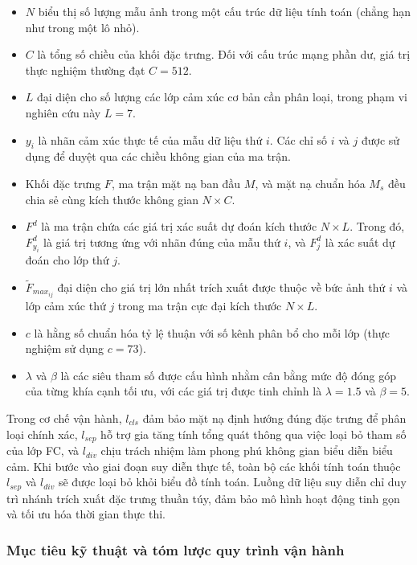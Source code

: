 \begin{itemize}
    \item $N$ biểu thị số lượng mẫu ảnh trong một cấu trúc dữ liệu tính toán (chẳng hạn như trong một lô nhỏ).
    \item $C$ là tổng số chiều của khối đặc trưng. Đối với cấu trúc mạng phần dư, giá trị thực nghiệm thường đạt $C = 512$.
    \item $L$ đại diện cho số lượng các lớp cảm xúc cơ bản cần phân loại, trong phạm vi nghiên cứu này $L = 7$.
    \item $y_i$ là nhãn cảm xúc thực tế của mẫu dữ liệu thứ $i$. Các chỉ số $i$ và $j$ được sử dụng để duyệt qua các chiều không gian của ma trận.
    \item Khối đặc trưng $F$, ma trận mặt nạ ban đầu $M$, và mặt nạ chuẩn hóa $M_s$ đều chia sẻ cùng kích thước không gian $N \times C$.
    \item $F^d$ là ma trận chứa các giá trị xác suất dự đoán kích thước $N \times L$. Trong đó, $F^d_{y_i}$ là giá trị tương ứng với nhãn đúng của mẫu thứ $i$, và $F^d_j$ là xác suất dự đoán cho lớp thứ $j$.
    \item $\tilde{F}_{max_{ij}}$ đại diện cho giá trị lớn nhất trích xuất được thuộc về bức ảnh thứ $i$ và lớp cảm xúc thứ $j$ trong ma trận cực đại kích thước $N \times L$.
    \item $c$ là hằng số chuẩn hóa tỷ lệ thuận với số kênh phân bổ cho mỗi lớp (thực nghiệm sử dụng $c = 73$).
    \item $\lambda$ và $\beta$ là các siêu tham số được cấu hình nhằm cân bằng mức độ đóng góp của từng khía cạnh tối ưu, với các giá trị được tinh chỉnh là $\lambda = 1.5$ và $\beta = 5$.
\end{itemize}

Trong cơ chế vận hành, $l_{cls}$ đảm bảo mặt nạ định hướng đúng đặc trưng để phân loại chính xác, $l_{sep}$ hỗ trợ gia tăng tính tổng quát thông qua việc loại bỏ tham số của lớp FC, và $l_{div}$ chịu trách nhiệm làm phong phú không gian biểu diễn biểu cảm. Khi bước vào giai đoạn suy diễn thực tế, toàn bộ các khối tính toán thuộc $l_{sep}$ và $l_{div}$ sẽ được loại bỏ khỏi biểu đồ tính toán. Luồng dữ liệu suy diễn chỉ duy trì nhánh trích xuất đặc trưng thuần túy, đảm bảo mô hình hoạt động tinh gọn và tối ưu hóa thời gian thực thi.

\subsubsection{Mục tiêu kỹ thuật và tóm lược quy trình vận hành}

